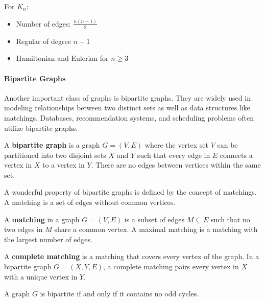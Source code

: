 \begin{theorem}
For $K_n$:
\begin{itemize}
    \item Number of edges: $\frac{n(n-1)}{2}$
    \item Regular of degree $n-1$
    \item Hamiltonian and Eulerian for $n \geq 3$
\end{itemize}
\end{theorem}

\paragraph{Bipartite Graphs}
Another important class of graphs is bipartite graphs. They are widely used in modeling relationships between two distinct sets as well as data structures like matchings. Databases, recommendation systems, and scheduling problems often utilize bipartite graphs.

\begin{definition}
A \textbf{bipartite graph} is a graph $G = (V, E)$ where the vertex set $V$ can be partitioned into two disjoint sets $X$ and $Y$ such that every edge in $E$ connects a vertex in $X$ to a vertex in $Y$. There are no edges between vertices within the same set.
\end{definition}

A wonderful property of bipartite graphs is defined by the concept of matchings. A matching is a set of edges without common vertices.

\begin{definition}
A \textbf{matching} in a graph $G = (V, E)$ is a subset of edges $M \subseteq E$ such that no two edges in $M$ share a common vertex. A maximal matching is a matching with the largest number of edges.
\end{definition}

\begin{definition}
A \textbf{complete matching} is a matching that covers every vertex of the graph. In a bipartite graph $G = (X, Y, E)$, a complete matching pairs every vertex in $X$ with a unique vertex in $Y$.
\end{definition}

\begin{theorem}
A graph $G$ is bipartite if and only if it contains no odd cycles.
\end{theorem}

